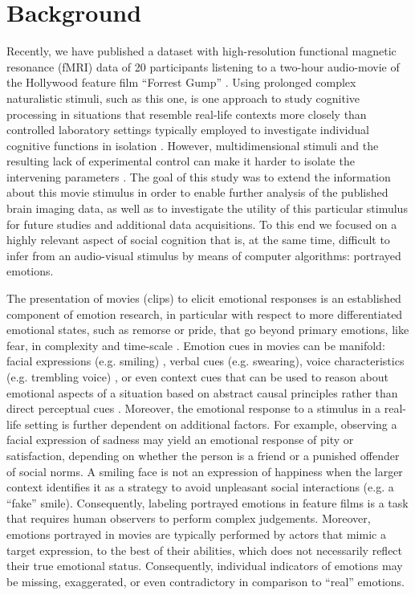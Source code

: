 \section*{Background} 


Recently, we have published a dataset with high-resolution functional magnetic
resonance (fMRI) data of 20 participants listening to a two-hour audio-movie of
the Hollywood feature film ``Forrest Gump'' \cite{HBI+14}. Using prolonged
complex naturalistic stimuli, such as this one, is one approach to study
cognitive processing in situations that resemble real-life contexts more
closely than controlled laboratory settings typically employed to investigate
individual cognitive functions in isolation \cite{HH2012}. However,
multidimensional stimuli and the resulting lack of experimental control can
make it harder to isolate the intervening parameters \cite{HH2012}.  The goal
of this study was to extend the information about this movie stimulus in order
to enable further analysis of the published brain imaging data, as well as to
investigate the utility of this particular stimulus for future studies and
additional data acquisitions. To this end we focused on a highly relevant
aspect of social cognition that is, at the same time, difficult to infer from
an audio-visual stimulus by means of computer algorithms: portrayed emotions.

The presentation of movies (clips) to elicit emotional responses is an
established component of emotion research, in particular with respect to more
differentiated emotional states, such as remorse or pride, that go beyond
primary emotions, like fear, in complexity and time-scale \cite{GL1995}. Emotion
cues in movies can be manifold: facial expressions (e.g.
smiling) \cite{Ekm1992b}, verbal cues (e.g. swearing), voice characteristics
(e.g. trembling voice) \cite{EVS+2009}, or even context cues that can be used to
reason about emotional aspects of a situation based on abstract causal
principles rather than direct perceptual cues \cite{SS2014}.  Moreover, the
emotional response to a stimulus in a real-life setting is further dependent on
additional factors. For example, observing a facial expression of sadness may
yield an emotional response of pity or satisfaction, depending on whether the
person is a friend or a punished offender of social norms. A smiling face is
not an expression of happiness when the larger context identifies it as a
strategy to avoid unpleasant social interactions (e.g. a ``fake'' smile).
Consequently, labeling portrayed emotions in feature films is a task that
requires human observers to perform complex judgements. Moreover, emotions portrayed in
movies are typically performed by actors that mimic a target expression, to the
best of their abilities, which does not necessarily reflect their true emotional
status.  Consequently, individual indicators of emotions may be missing,
exaggerated, or even contradictory in comparison to ``real'' emotions.

